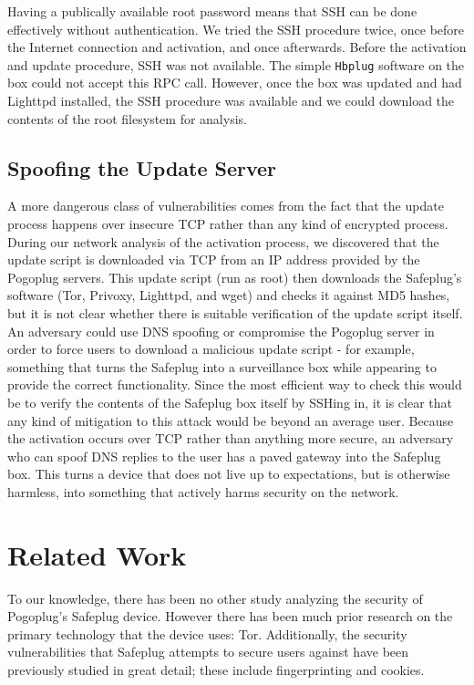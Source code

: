 \documentclass[conference]{IEEEtran}
\begin{document}
Having a publically available root password means that SSH can be done effectively without authentication.  We tried the SSH procedure twice, once before the Internet connection and activation, and once afterwards.  Before the activation and update procedure, SSH was not available.  The simple \verb!Hbplug! software on the box could not accept this RPC call.  However, once the box was updated and had Lighttpd installed, the SSH procedure was available and we could download the contents of the root filesystem for analysis.

\subsection{Spoofing the Update Server}
\label{dnsspoof}
A more dangerous class of vulnerabilities comes from the fact that the update process happens over insecure TCP rather than any kind of encrypted process.  During our network analysis of the activation process, we discovered that the update script is downloaded via TCP from an IP address provided by the Pogoplug servers.  This update script (run as root) then downloads the Safeplug's software (Tor, Privoxy, Lighttpd, and wget) and checks it against MD5 hashes, but it is not clear whether there is suitable verification of the update script itself.  An adversary could use DNS spoofing or compromise the Pogoplug server in order to force users to download a malicious update script - for example, something that turns the Safeplug into a surveillance box while appearing to provide the correct functionality.  Since the most efficient way to check this would be to verify the contents of the Safeplug box itself by SSHing in, it is clear that any kind of mitigation to this attack would be beyond an average user.  Because the activation occurs over TCP rather than anything more secure, an adversary who can spoof DNS replies to the user has a paved gateway into the Safeplug box.  This turns a device that does not live up to expectations, but is otherwise harmless, into something that actively harms security on the network.

\section{Related Work}
To our knowledge, there has been no other study analyzing the security of Pogoplug's Safeplug device.  However there has been much prior research on the primary technology that the device uses: Tor.  Additionally, the security vulnerabilities that Safeplug attempts to secure users against have been previously studied in great detail; these include fingerprinting and cookies.  
\end{document}
